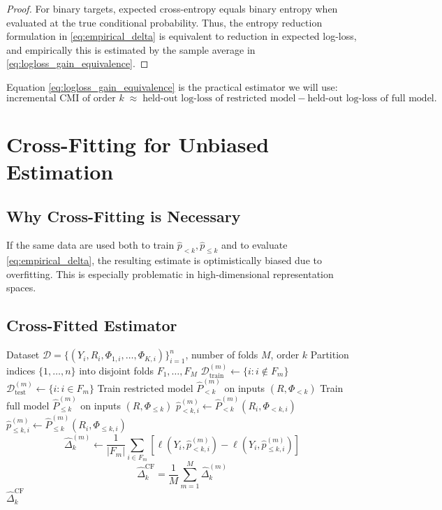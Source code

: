 \documentclass[11pt]{article}
\newcommand{\1}{\mathbf{1}}
\begin{document}
\begin{proof}
For binary targets, expected cross-entropy equals binary entropy when evaluated at the true
conditional probability. Thus, the entropy reduction formulation in
\eqref{eq:empirical_delta} is equivalent to reduction in expected log-loss, and empirically this is
estimated by the sample average in \eqref{eq:logloss_gain_equivalence}.
\end{proof}

Equation \eqref{eq:logloss_gain_equivalence} is the practical estimator we will use:
\[
\text{incremental CMI of order } k
\;\approx\;
\text{held-out log-loss of restricted model}
-
\text{held-out log-loss of full model}.
\]

\section{Cross-Fitting for Unbiased Estimation}

\subsection{Why Cross-Fitting is Necessary}

If the same data are used both to train $\hat p_{<k},\hat p_{\le k}$ and to evaluate
\eqref{eq:empirical_delta}, the resulting estimate is optimistically biased due to overfitting.
This is especially problematic in high-dimensional representation spaces.

\subsection{Cross-Fitted Estimator}

\begin{algorithm}[h]
\caption{Cross-Fitted Estimation of $\Delta_k = I(Y;\Phi_k\mid R,\Phi_{<k})$}
\begin{algorithmic}[1]
\Require Dataset $\mathcal{D}=\{(Y_i,R_i,\Phi_{1,i},\ldots,\Phi_{K,i})\}_{i=1}^n$, number of folds $M$, order $k$
\State Partition indices $\{1,\ldots,n\}$ into disjoint folds $F_1,\ldots,F_M$
    \State $\mathcal{D}^{(m)}_{\mathrm{train}} \gets \{i : i \notin F_m\}$
    \State $\mathcal{D}^{(m)}_{\mathrm{test}} \gets \{i : i \in F_m\}$
    \State Train restricted model $\widehat P^{(m)}_{<k}$ on inputs $(R,\Phi_{<k})$
    \State Train full model $\widehat P^{(m)}_{\le k}$ on inputs $(R,\Phi_{\le k})$
        \State $\hat p^{(m)}_{<k,i} \gets \widehat P^{(m)}_{<k}(R_i,\Phi_{<k,i})$
        \State $\hat p^{(m)}_{\le k,i} \gets \widehat P^{(m)}_{\le k}(R_i,\Phi_{\le k,i})$
    \EndFor
    \State
    \[
    \widehat{\Delta}^{(m)}_k
    \gets
    \frac{1}{|F_m|}
    \sum_{i\in F_m}
    \left[
    \ell(Y_i,\hat p^{(m)}_{<k,i})
    -
    \ell(Y_i,\hat p^{(m)}_{\le k,i})
    \right]
    \]
\EndFor
\State
\[
\widehat{\Delta}^{\mathrm{CF}}_k
=
\frac{1}{M}\sum_{m=1}^M \widehat{\Delta}^{(m)}_k
\]
\State \Return $\widehat{\Delta}^{\mathrm{CF}}_k$
\end{algorithmic}
\end{algorithm}
\end{document}
